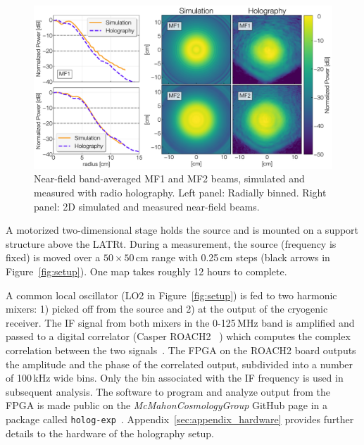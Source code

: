  \begin{figure}[t]
    \centering
    \includegraphics[width = \textwidth]{Figures/nearfields.pdf}
    \caption{Near-field band-averaged MF1 and MF2 beams, simulated and measured with radio holography. Left panel: Radially binned.  Right panel: 2D simulated and measured near-field beams.}
    \label{fig:nearfields}
\end{figure}

A motorized two-dimensional  stage holds the source and is mounted on a support structure above the LATRt.  During a measurement, the source (frequency is fixed) is moved over a $50\times50$\,cm range with 0.25\,cm steps (black arrows in Figure~\ref{fig:setup}).   One map takes roughly 12 hours to complete.

A common local oscillator (LO2 in Figure~\ref{fig:setup}) is fed to two harmonic mixers: 1) picked off from the source and 2) at the output of the cryogenic receiver.  The IF signal from both mixers in the 0-125\,MHz band is amplified and passed to a digital correlator (Casper ROACH2 ~\cite{roach2}) which computes the complex correlation between the two signals~\cite{ches18}.  The FPGA on the ROACH2 board outputs the amplitude and the phase of the correlated output, subdivided into a number of 100\,kHz wide bins.  Only the bin associated with the IF frequency is used in subsequent analysis.  The software to program and analyze output from the FPGA is made public on the \textit{McMahonCosmologyGroup} GitHub page in a package called \verb|holog-exp|~\cite{holog-exp}.  Appendix~\ref{sec:appendix_hardware} provides further details to the hardware of the holography setup.

\begin{figure}[H]
  \centering
  \savebox{\myimage}{\rule{550pt}{150pt}}%
\end{figure}

